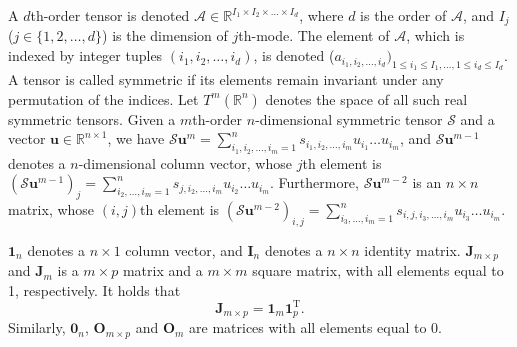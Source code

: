 \documentclass{elsarticle}
\begin{document}
A  $d$th-order tensor is denoted 
$\mathcal A \in \mathbb {R}^{I_1 \times I_2  \times \dots \times I_{d} }$,
where 
$d$
is the order   of
$\mathcal A $, and 
$ I_j $ ($  j \in \{ 1,2,\dots,d \}$)  is  the  dimension  of  
$j$th-mode.
The element of $\mathcal A$,    which  is  indexed  by integer tuples $(i_1,i_2,\dots,i_d) $, is denoted 
($a_{i_1,i_2,\dots,i_d})_
{1 \le i_1 \le I_1, 
	\dots, 
	1 \le i_d \le I_d}
$. 
A   tensor is called    symmetric if its elements remain invariant under any permutation of 
the  indices\cite{kolda}. 
Let    $  T^{m}(\mathbb R^{n}) $ denotes   the  space  of  all  such  real  symmetric    tensors.
Given a $m$th-order  $n$-dimensional symmetric  tensor  $\mathcal S $ and  a  vector $ \mathbf u \in \mathbb {R}^{n \times 1}$, we have
$ 
\mathcal S \mathbf u^{m} =
\sum\limits_{i_1,i_2,\dots,i_m=1}^{n} 
s_{i_1,i_2,\dots,i_m}  u_{i_1} \dots   u_{i_{m}}
$, 
and  $   \mathcal S \mathbf u^{m-1}   $   denotes   a    $n$-dimensional
column   
vector,  whose  $j$th  element   is    
$
(\mathcal S \mathbf u^{m-1})_{j} =
\sum\limits_{i_2,\dots,i_m =1}^{n} 
s_{j,i_2,\dots,i_m}  u_{i_2} \dots   u_{i_{m}}
$\cite{Cuicf}.
Furthermore,   $   \mathcal S \mathbf u^{m-2}   $   is  an    $n  \times  n $  matrix,    whose  $(i, j )$th  element   is  
$
(\mathcal S \mathbf u^{m-2})_{i, j} =
\sum\limits_{i_3,\dots,i_m =1}^{n} 
s_{i,j,i_3,\dots,i_m}  u_{i_3} \dots   u_{i_{m}}.
$

$\mathbf  1_{n}$   denotes   a  $ n  \times  1$ column vector,  and  $\mathbf  I_{n}$   denotes   a  $ n  \times  n$  identity  matrix.
$\mathbf  J_{m \times p}$    and  $\mathbf  J_{m}$    is   a   $ m  \times  p$  matrix  and   a  $ m  \times  m$    square    matrix,     with all  elements equal to 1,  respectively. 
It holds   that\cite{zhang2017matrix}
\begin{equation}\label{Jproperty}
\mathbf  J_{m \times p} = \mathbf  1_{m}  \mathbf  1_{p}^{\mathrm {T}}. 
\end{equation}
Similarly,  $\mathbf  0_{n}$,  $\mathbf  O_{m \times p}$    and  $\mathbf  O_{m}$   are   matrices   with all  elements equal to 0.
\end{document}
